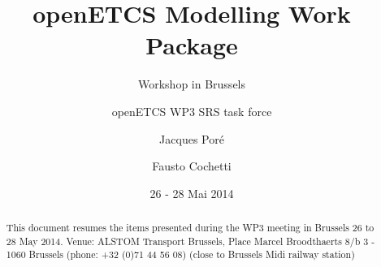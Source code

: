 \documentclass{template/openetcs_report}
\begin{document}
\frontmatter
{}




\title{openETCS Modelling Work Package}

\subtitle{Workshop in Brussels}

\date{26 - 28 Mai 2014}


\author{openETCS WP3 SRS task force}

 
\author{Jacques Por\'e}


\author{Fausto Cochetti}






\begin{abstract}

  This document resumes the items presented during the WP3 meeting in Brussels 26 to 28 May 2014. Venue: ALSTOM Transport Brussels,
  Place Marcel Broodthaerts 8/b 3  -  1060 Brussels (phone: +32 (0)71 44 56 08)
  (close to Brussels Midi railway station)



\end{abstract}

\maketitle
\tableofcontents
\listoffiguresandtables
\newpage



\end{document}
